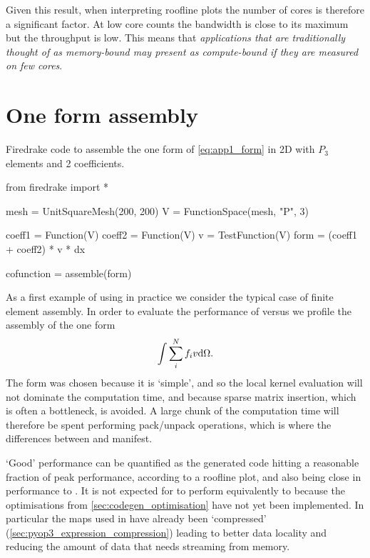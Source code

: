 \documentclass[thesis]{subfiles}
\begin{document}
Given this result, when interpreting roofline plots the number of cores is therefore a significant factor.
At low core counts the bandwidth is close to its maximum but the throughput is low.
This means that \emph{applications that are traditionally thought of as memory-bound may present as compute-bound if they are measured on few cores}.

\section{One form assembly}
\label{sec:demo_apps_one_form_assembly}

\begin{listing}
  \centering
  \caption{
    Firedrake code to assemble the one form of \cref{eq:app1_form} in 2D with $P_3$ elements and 2 coefficients.
  }
  \begin{minipage}{.9\textwidth}
    \begin{pyalg2}
      from firedrake import *

      mesh = UnitSquareMesh(200, 200)
      V = FunctionSpace(mesh, "P", 3)

      coeff1 = Function(V)
      coeff2 = Function(V)
      v = TestFunction(V)
      form = (coeff1 + coeff2) * v * dx

      cofunction = assemble(form)
    \end{pyalg2}
  \end{minipage}
  \label{listing:app1_code}
\end{listing}


As a first example of using  in practice we consider the typical case of finite element assembly.
In order to evaluate the performance of  versus  we profile the assembly of the one form
\begin{equation}
  \label{eq:app1_form}
  \int \sum_i^N f_i v \textnormal{d}\Omega.
\end{equation}
The form was chosen because it is `simple', and so the local kernel evaluation will not dominate the computation time, and because sparse matrix insertion, which is often a bottleneck, is avoided.
A large chunk of the computation time will therefore be spent performing pack/unpack operations, which is where the differences between  and  manifest.

`Good' performance can be quantified as the generated code hitting a reasonable fraction of peak performance, according to a roofline plot, and also being close in performance to .
It is not expected for  to perform equivalently to  because the optimisations from \cref{sec:codegen_optimisation} have not yet been implemented.
In particular the maps used in  have already been `compressed' (\cref{sec:pyop3_expression_compression}) leading to better data locality and reducing the amount of data that needs streaming from memory.
\end{document}
